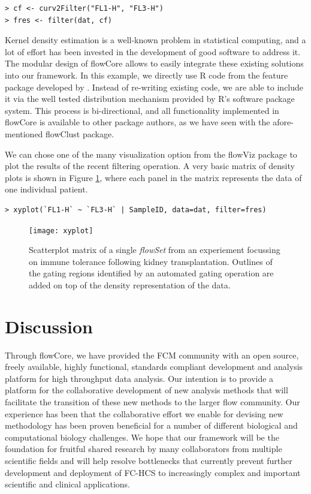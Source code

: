 \documentclass[12pt]{article}
\newcommand{\Rpackage}[1]{{\textsf{#1}}}
\newcommand{\Rclass}[1]{{\textit{#1}}}
\begin{document}
\begin{verbatim}
> cf <- curv2Filter("FL1-H", "FL3-H")
> fres <- filter(dat, cf)
\end{verbatim}

Kernel density estimation is a well-known problem in statistical
computing, and a lot of effort has been invested in the development of
good software to address it. The modular design of \Rpackage{flowCore}
allows to easily integrate these existing solutions into our
framework. In this example, we directly use R code from the
\Rpackage{feature} package developed by \cite{wand2008}. Instead of
re-writing existing code, we are able to include it via the well
tested distribution mechanism provided by R's software package
system. This process is bi-directional, and all functionality
implemented in \Rpackage{flowCore} is available to other package
authors, as we have seen with the afore-mentioned \Rpackage{flowClust}
package.

We can chose one of the many visualization option from the flowViz
package to plot the results of the recent filtering operation. A very
basic matrix of density plots is shown in Figure \ref{xyplot}, where
each panel in the matrix represents the data of one individual
patient.

\begin{verbatim}
> xyplot(`FL1-H` ~ `FL3-H` | SampleID, data=dat, filter=fres)
\end{verbatim}


\begin{singlespace}
\begin{figure}[htbp]
\centering
\texttt{[image: xyplot]}
\caption{\label{xyplot}%
  Scatterplot matrix of a single \Rclass{flowSet} from an experiement
  focussing on immune tolerance following kidney
  transplantation. Outlines of the gating regions identified by an
  automated gating operation are added on top of the density
  representation of the data.}
\end{figure}
\end{singlespace}


\section*{Discussion}

Through \Rpackage{flowCore}, we have provided the FCM community with
an open source, freely available, highly functional, standards
compliant development and analysis platform for high throughput data
analysis.  Our intention is to provide a platform for the
collaborative development of new analysis methods that will facilitate
the transition of these new methods to the larger flow community.  Our
experience has been that the collaborative effort we enable for
devising new methodology has been proven beneficial for a number of
different biological and computational biology challenges.  We hope
that our framework will be the foundation for fruitful shared research
by many collaborators from multiple scientific fields and will help
resolve bottlenecks that currently prevent further development and
deployment of FC-HCS to increasingly complex and important scientific
and clinical applications.
\end{document}
